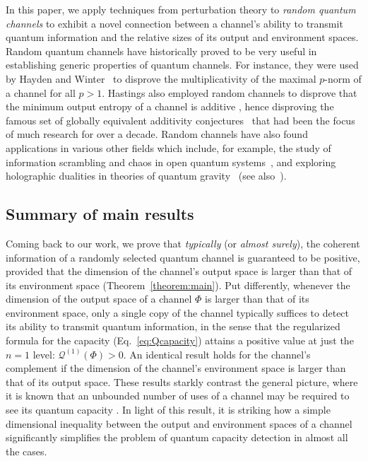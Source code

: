 \documentclass[a4paper,onecolumn,10pt,accepted=2022-07-11]{quantumarticle}
\theoremstyle{definition}
\begin{document}
In this paper, we apply techniques from perturbation theory to \emph{random quantum channels} to exhibit a novel connection between a channel's ability to transmit quantum information and the relative sizes of its output and environment spaces. Random quantum channels have historically proved to be very useful in establishing generic properties of quantum channels. For instance, they were used by Hayden and Winter~\cite{Hayden2008pnorm, Montanaro2013pnorm} to disprove the multiplicativity of the maximal $p$-norm of a channel for all $p>1$. Hastings also employed random channels to disprove that the minimum output entropy of a channel is additive \cite{Hastings2009counter}, hence disproving the famous set of globally equivalent additivity conjectures~\cite{Shor2004equivalence} that had been the focus of much research for over a decade. Random channels have also found applications in various other fields which include, for example, the study of information scrambling and chaos in open quantum systems~\cite{Hosur2016chaos, zanardi2021information}, and exploring holographic dualities in theories of quantum gravity~\cite{Hayden2016holograph} (see also~\cite{movassagh2020theory}).

\subsection{Summary of main results}

Coming back to our work, we prove that \emph{typically} (or \emph{almost surely}), the coherent information of a randomly selected quantum channel is guaranteed to be positive, provided that the dimension of the channel's output space is larger than that of its environment space (Theorem~\ref{theorem:main}). Put differently, whenever the dimension of the output space of a channel $\Phi$ is larger than that of its environment space, only a single copy of the channel typically suffices to detect its ability to transmit quantum information, in the sense that the regularized formula for the capacity (Eq.~\eqref{eq:Qcapacity}) attains a positive value at just the $n=1$ level: $\mathcal{Q}^{(1)}(\Phi)>0$. An identical result holds for the channel's complement if the dimension of the channel's environment space is larger than that of its output space. These results starkly contrast the general picture, where it is known that an unbounded number of uses of a channel may be required to see its quantum capacity \cite{Cubitt2015unbounded}. In light of this result, it is striking how a simple dimensional inequality between the output and environment spaces of a channel significantly simplifies the problem of quantum capacity detection in almost all the cases.
\end{document}
